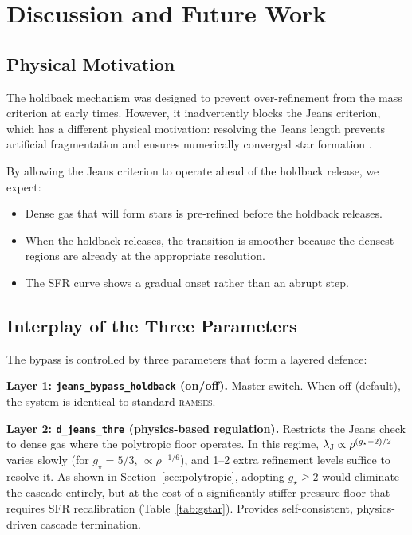 \documentclass[fleqn,usenatbib]{mnras}
\newcommand{\lJ}{\lambda_{\rm J}}
\newcommand{\gstar}{g_\star}
\newcommand{\ramses}{\textsc{ramses}}
\newcommand{\code}[1]{\texttt{#1}}
\begin{document}
\section{Discussion and Future Work}
\label{sec:discussion}

\subsection{Physical Motivation}

The holdback mechanism was designed to prevent over-refinement from the
mass criterion at early times.  However, it inadvertently blocks the
Jeans criterion, which has a different physical motivation: resolving
the Jeans length prevents artificial fragmentation and ensures
numerically converged star formation \citep{Truelove1997, Federrath2011}.

By allowing the Jeans criterion to operate ahead of the holdback
release, we expect:
\begin{itemize}
  \item Dense gas that will form stars is pre-refined before the
    holdback releases.
  \item When the holdback releases, the transition is smoother because
    the densest regions are already at the appropriate resolution.
  \item The SFR curve shows a gradual onset rather than an abrupt step.
\end{itemize}

\subsection{Interplay of the Three Parameters}

The bypass is controlled by three parameters that form a layered
defence:

\textbf{Layer 1: \code{jeans\_bypass\_holdback} (on/off).}
Master switch.  When off (default), the system is identical to
standard \ramses.

\textbf{Layer 2: \code{d\_jeans\_thre} (physics-based regulation).}
Restricts the Jeans check to dense gas where the polytropic floor
operates.  In this regime, $\lJ \propto \rho^{(\gstar-2)/2}$ varies
slowly (for $\gstar = 5/3$, $\propto \rho^{-1/6}$), and 1--2 extra
refinement levels suffice to resolve it.  As shown in
Section~\ref{sec:polytropic}, adopting $\gstar \ge 2$ would eliminate
the cascade entirely, but at the cost of a significantly stiffer
pressure floor that requires SFR recalibration
(Table~\ref{tab:gstar}).  Provides self-consistent, physics-driven
cascade termination.
\end{document}
